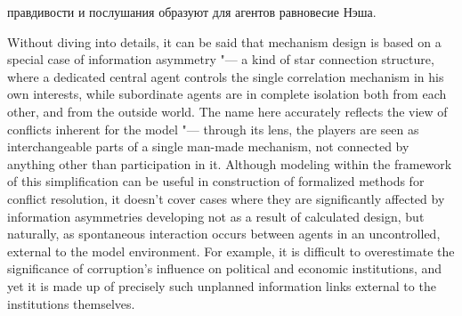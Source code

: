 правдивости и послушания образуют для агентов равновесие Нэша.

Without diving into details, it can be said that mechanism design is based on a special case of information asymmetry "--- a kind of star connection structure, where a dedicated central agent controls the single correlation mechanism in his own interests, while subordinate agents are in complete isolation both from each other, and from the outside world. The name here accurately reflects the view of conflicts inherent for the model "--- through its lens, the players are seen as interchangeable parts of a single man-made mechanism, not connected by anything other than participation in it. Although modeling within the framework of this simplification can be useful in construction of formalized methods for conflict resolution, it doesn't cover cases where they are significantly affected by information asymmetries developing not as a result of calculated design, but naturally, as spontaneous interaction occurs between agents in an uncontrolled, external to the model environment. For example, it is difficult to overestimate the significance of corruption's influence on political and economic institutions, and yet it is made up of precisely such unplanned information links external to the institutions themselves. %

